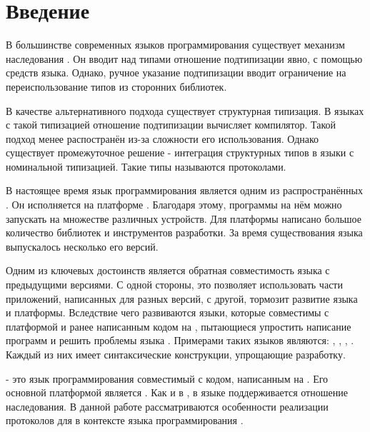 \section*{Введение}

В большинстве современных языков программирования существует механизм наследования \cite{Cook:1989:IS:96709.96721}. Он вводит над типами отношение подтипизации явно, с помощью средств языка. Однако, ручное указание подтипизации вводит ограничение на переиспользование типов из сторонних библиотек.

В качестве альтернативного подхода существует структурная типизация\cite{book:pierce}. В языках с такой типизацией отношение подтипизации вычисляет компилятор. Такой подход менее распостранён из-за сложности его использования. Однако существует промежуточное решение - интеграция структурных типов в языки с номинальной типизацией. Такие типы называются протоколами.

В настоящее время язык программирования  является одним из распространённых \cite{tiobe}. Он исполняется на платформе   . Благодаря этому, программы на нём можно запускать на множестве различных устройств. Для платформы написано большое количество библиотек и инструментов разработки. За время существования языка выпускалось несколько его версий.

Одним из ключевых достоинств  является обратная совместимость языка с предыдущими версиями\cite{openjdk:compatibility}. С одной стороны, это позволяет использовать части приложений, написанных для разных версий, с другой, тормозит развитие языка и платформы. Вследствие чего развиваются языки, которые совместимы с платформой  и ранее написанным кодом на , пытающиеся упростить написание программ и решить проблемы языка . Примерами таких языков являются: , , , . Каждый из них имеет синтаксические конструкции, упрощающие разработку.

 - это язык программирования совместимый с кодом, написанным на . Его основной платформой является . Как и в , в языке  поддерживается отношение наследования. В данной работе рассматриваются особенности реализации протоколов для  в контексте языка программирования .
